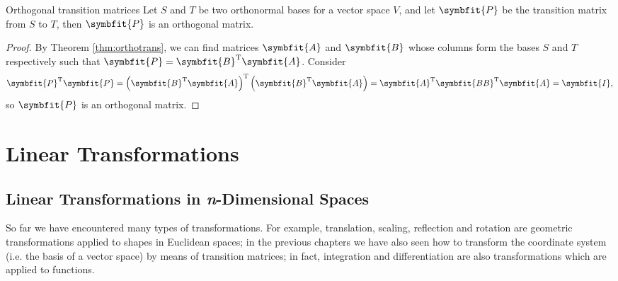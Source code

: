\documentclass[math]{amznotes}
\theoremstyle{remark}
\begin{document}
\begin{thmbox}{Orthogonal transition matrices}{}
    Let $S$ and $T$ be two orthonormal bases for a vector space $V$, and let $\symbfit{P}$ be the transition matrix from $S$ to $T$, then $\symbfit{P}$ is an orthogonal matrix.
    \tcblower
    \begin{proof}
        By Theorem \ref{thm:orthotrans}, we can find matrices $\symbfit{A}$ and $\symbfit{B}$ whose columns form the bases $S$ and $T$ respectively such that $\symbfit{P} = \symbfit{B}^{\mathrm{T}}\symbfit{A}$. Consider
        \begin{equation*}
            \symbfit{P}^{\mathrm{T}}\symbfit{P} = \left(\symbfit{B}^{\mathrm{T}}\symbfit{A}\right)^{\mathrm{T}} \left(\symbfit{B}^{\mathrm{T}}\symbfit{A}\right) = \symbfit{A}^{\mathrm{T}}\symbfit{BB}^{\mathrm{T}}\symbfit{A} = \symbfit{I},
        \end{equation*}
        so $\symbfit{P}$ is an orthogonal matrix.
    \end{proof}
\end{thmbox}

\chapter{Linear Transformations}
\section{Linear Transformations in \textit{n}-Dimensional   Spaces}
So far we have encountered many types of transformations. For example, translation, scaling, reflection and rotation are geometric transformations applied to shapes in Euclidean spaces; in the previous chapters we have also seen how to transform the coordinate system (i.e. the basis of a vector space) by means of transition matrices; in fact, integration and differentiation are also transformations which are applied to functions.
\end{document}
